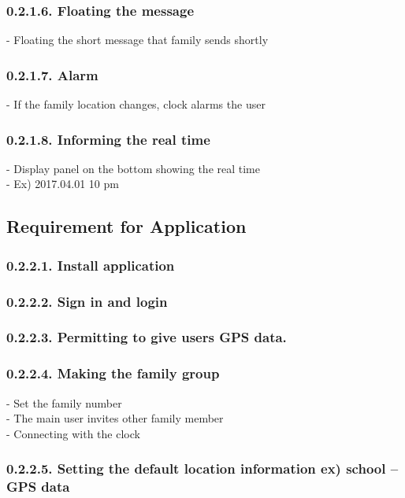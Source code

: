 \documentclass[10pt,a4paper,twocolumn]{report}
\begin{document}
		\subsubsection{0.2.1.6. Floating the message} 
		- Floating the short message that family sends shortly \\
		
		\subsubsection{0.2.1.7. Alarm} 
		- If the family location changes, clock alarms the user  \\
		
		\subsubsection{0.2.1.8. Informing the real time} 
		- Display panel on the bottom showing the real time \\
        - Ex) 2017.04.01 10 pm \\

	\subsection{Requirement for Application}
		\subsubsection{0.2.2.1. Install application}
		
		\subsubsection{0.2.2.2. Sign in and login}

		\subsubsection{0.2.2.3. Permitting to give users GPS data.}

		\subsubsection{0.2.2.4. Making the family group}
		- Set the family number \\
		- The main user invites other family member \\
		- Connecting with the clock \\

		\subsubsection{0.2.2.5. Setting the default location information ex) school – GPS data}
\end{document}
